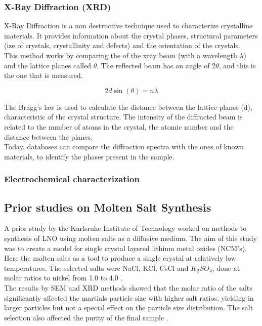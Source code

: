 \documentclass{article}
\begin{document}
\subsubsection{X-Ray Diffraction (XRD)}
X-Ray Diffraction is a non destructive technique used to characterize crystalline materials. 
It provides information about the crystal phases, structural parameters (ize of crystals, crystallinity  and defects) and the orientation of the crystals.\\
This method works by comparing the of the xray beam (with a wavelength $\lambda$) and the lattice planes called $\theta$. The reflected beam has an angle of $2\theta$, and this is the one that is measured.


\begin{equation}
2d \sin(\theta) = n\lambda   
\end{equation}

The Bragg's law is used to calculate the distance between the lattice planes (d), characteristic of the crystal structure. 
The intensity of the diffracted beam is related to the number of atoms in the crystal, the atomic number and the distance between the planes.\\

Today, databases can compare the diffraction spectra with the ones of known materials, to identify the phases present in the sample.\\

\subsubsection{Electrochemical characterization}

\subsection{Prior studies on Molten Salt Synthesis}
A prior study by the Karlsruhe Institute of Technology  worked on methods to 
synthesis of LNO using molten salts as a diffusive medium.
The aim of this study was to create a model for single crystal
layered lithium metal oxides (NCM's).\\
Here the molten salts as a tool to produce a single crystal
at relatively low temperatures.
The selected salts were NaCl, KCl, CsCl and \(K_{2}SO_{4}\), 
done at molar ratios to nickel from 1.0 to 4.0 \cite{meltingp}.\\
The results by SEM and XRD methods showed that the molar ratio
of the salts significantly affected the martials particle size with 
higher salt ratios, yielding in larger particles but not a special effect on the particle size distribution.
 The salt selection also affected the purity of the final sample \cite{meltingp}. \\
\end{document}
